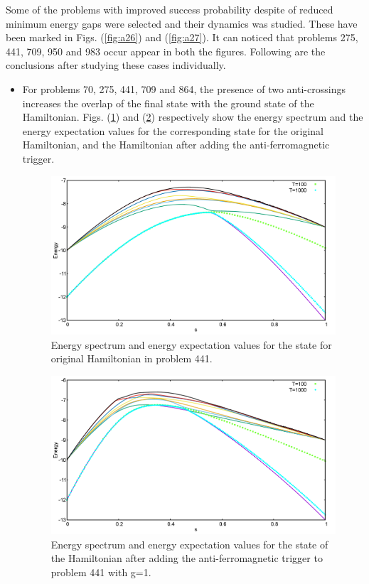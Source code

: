 \documentclass[../main.tex]{subfiles}
\begin{document}
Some of the problems with improved success probability despite of reduced minimum energy gaps were selected and their dynamics was studied. These have been marked in Figs. (\ref{fig:a26}) and (\ref{fig:a27}). It can noticed that problems 275, 441, 709, 950 and 983 occur appear in both the figures. Following are the conclusions after studying these cases individually.
\begin{itemize}
\item For problems 70, 275, 441, 709 and 864, the presence of two anti-crossings increases the overlap of the final state with the ground state of the Hamiltonian.  Figs. (\ref{fig:a28}) and (\ref{fig:a29}) respectively show the energy spectrum and the energy expectation values for the corresponding state for the original Hamiltonian, and the Hamiltonian after adding the anti-ferromagnetic trigger.


\begin{figure}[H]
\centering 
\includegraphics[scale=0.24]{441_O_T100_1000.png}
\caption{Energy spectrum and energy expectation values for the state for original Hamiltonian in problem 441.}
\label{fig:a28}
\end{figure}
\begin{figure}[H]
\centering 
\includegraphics[scale=0.24]{441_A_g1_T100_1000.png}
\caption{Energy spectrum and energy expectation values for the state of the Hamiltonian after adding the anti-ferromagnetic trigger to problem 441 with g=1.}
\label{fig:a29}
\end{figure}


\end{itemize}
\end{document}
